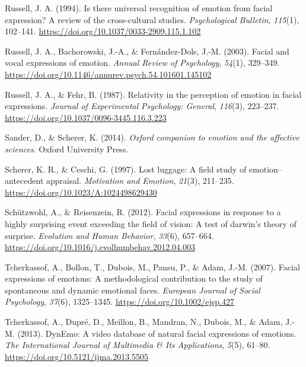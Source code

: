 \documentclass[
  english,
  doc]{apa7}
\newlength{\cslhangindent}
\newenvironment{cslreferences}%
  {\setlength{\parindent}{0pt}%
  \everypar{\setlength{\hangindent}{\cslhangindent}}\ignorespaces}%
  {\par}
\begin{document}
\begin{cslreferences}
\leavevmode\hypertarget{ref-russell1994there}{}%
Russell, J. A. (1994). Is there universal recognition of emotion from facial expression? A review of the cross-cultural studies. \emph{Psychological Bulletin}, \emph{115}(1), 102--141. \url{https://doi.org/10.1037/0033-2909.115.1.102}

\leavevmode\hypertarget{ref-russell2003facial}{}%
Russell, J. A., Bachorowski, J.-A., \& Fernández-Dols, J.-M. (2003). Facial and vocal expressions of emotion. \emph{Annual Review of Psychology}, \emph{54}(1), 329--349. \url{https://doi.org/10.1146/annurev.psych.54.101601.145102}

\leavevmode\hypertarget{ref-russell1987relativity}{}%
Russell, J. A., \& Fehr, B. (1987). Relativity in the perception of emotion in facial expressions. \emph{Journal of Experimental Psychology: General}, \emph{116}(3), 223--237. \url{https://doi.org/10.1037/0096-3445.116.3.223}

\leavevmode\hypertarget{ref-sander2014oxford}{}%
Sander, D., \& Scherer, K. (2014). \emph{Oxford companion to emotion and the affective sciences}. Oxford University Press.

\leavevmode\hypertarget{ref-scherer1997lost}{}%
Scherer, K. R., \& Ceschi, G. (1997). Lost luggage: A field study of emotion--antecedent appraisal. \emph{Motivation and Emotion}, \emph{21}(3), 211--235. \url{https://doi.org/10.1023/A:1024498629430}

\leavevmode\hypertarget{ref-schutzwohl2012facial}{}%
Schützwohl, A., \& Reisenzein, R. (2012). Facial expressions in response to a highly surprising event exceeding the field of vision: A test of darwin's theory of surprise. \emph{Evolution and Human Behavior}, \emph{33}(6), 657--664. \url{https://doi.org/10.1016/j.evolhumbehav.2012.04.003}

\leavevmode\hypertarget{ref-tcherkassof2007facial}{}%
Tcherkassof, A., Bollon, T., Dubois, M., Pansu, P., \& Adam, J.-M. (2007). Facial expressions of emotions: A methodological contribution to the study of spontaneous and dynamic emotional faces. \emph{European Journal of Social Psychology}, \emph{37}(6), 1325--1345. \url{https://doi.org/10.1002/ejsp.427}

\leavevmode\hypertarget{ref-tcherkassof2013dynemo}{}%
Tcherkassof, A., Dupré, D., Meillon, B., Mandran, N., Dubois, M., \& Adam, J.-M. (2013). DynEmo: A video database of natural facial expressions of emotions. \emph{The International Journal of Multimedia \& Its Applications}, \emph{5}(5), 61--80. \url{https://doi.org/10.5121/ijma.2013.5505}


\end{cslreferences}
\end{document}
